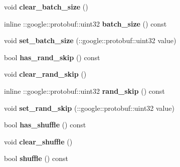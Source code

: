 \begin{DoxyCompactItemize}
void {\bfseries clear\+\_\+batch\+\_\+size} ()
\item 
\mbox{\label{classcaffe_1_1_image_data_parameter_ac32306d3bade1789f60dc93351493ddb}} 
inline \+::google\+::protobuf\+::uint32 {\bfseries batch\+\_\+size} () const
\item 
\mbox{\label{classcaffe_1_1_image_data_parameter_a19f1030946f81f70bcb8c9805d131e76}} 
void {\bfseries set\+\_\+batch\+\_\+size} (\+::google\+::protobuf\+::uint32 value)
\item 
\mbox{\label{classcaffe_1_1_image_data_parameter_ae04e4bd89c0d8c460e671479d2b9cefd}} 
bool {\bfseries has\+\_\+rand\+\_\+skip} () const
\item 
\mbox{\label{classcaffe_1_1_image_data_parameter_aa32fb07e3a500105c03281da25fe2fd1}} 
void {\bfseries clear\+\_\+rand\+\_\+skip} ()
\item 
\mbox{\label{classcaffe_1_1_image_data_parameter_ae8017a8bc0d62035b231ccfea6f65f12}} 
inline \+::google\+::protobuf\+::uint32 {\bfseries rand\+\_\+skip} () const
\item 
\mbox{\label{classcaffe_1_1_image_data_parameter_a9fc888185ebe28749d75b2616aa375c9}} 
void {\bfseries set\+\_\+rand\+\_\+skip} (\+::google\+::protobuf\+::uint32 value)
\item 
\mbox{\label{classcaffe_1_1_image_data_parameter_ab05c6e1cce920eb0d9e3ff713a169850}} 
bool {\bfseries has\+\_\+shuffle} () const
\item 
\mbox{\label{classcaffe_1_1_image_data_parameter_a18bc8f14e5463678b7d0cfe719b6c822}} 
void {\bfseries clear\+\_\+shuffle} ()
\item 
\mbox{\label{classcaffe_1_1_image_data_parameter_a40e362b226ca4bf8c1e535b50b281792}} 
bool {\bfseries shuffle} () const
\item 
\mbox{\label{classcaffe_1_1_image_data_parameter_aca8839fd8141b73db5f53cbe16b180ad}} 

\end{DoxyCompactItemize}
